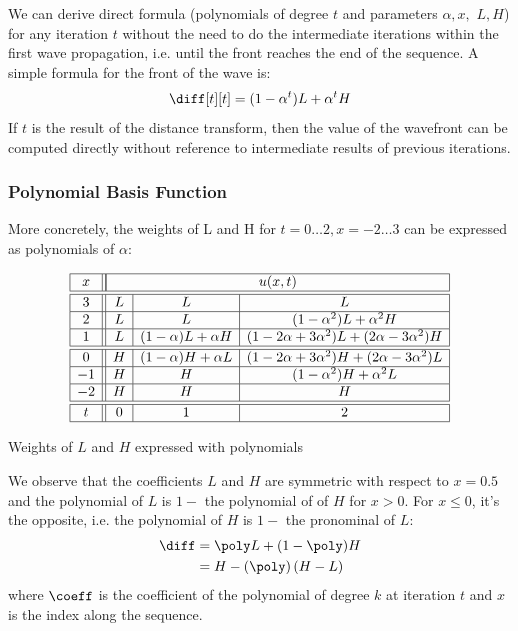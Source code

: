 We can derive direct formula (polynomials of degree $t$ and parameters $\alpha, x,$
$L, H$) for any iteration $t$ without the need to do the intermediate 
iterations within the first wave propagation, i.e. until the front reaches the end 
of the sequence. A simple formula for the front of the wave is:
%
\begin{equation}
    \diff[t][t] = (1 - \alpha^t)L + \alpha^t H
    \label{eq:wavefront}
\end{equation}
%
If $t$ is the result of the distance transform, then the value of the wavefront can be
computed directly without reference to intermediate results of previous iterations.

\subsubsection{Polynomial Basis Function}

More concretely, the weights of L and H for $t=0\ldots2,x=-2\ldots3$ can be expressed 
as polynomials of $\alpha$:

\begin{table}[h]
    \small
    \centering
    $$
        \begin{array}{|c||c|c|c|} \hline
         x & \multicolumn{3}{|c|}{u(x,t)} \\ \hline \hline
         3 & L &          L           &                     L                       \\ \hline
         2 & L &          L           &         (1-\alpha^2)L+\alpha^2H             \\ \hline
         1 & L & (1-\alpha)L+\alpha H & (1-2\alpha+3\alpha^2)L+(2\alpha-3\alpha^2)H \\ \hline \hline
         0 & H & (1-\alpha)H+\alpha L & (1-2\alpha+3\alpha^2)H+(2\alpha-3\alpha^2)L \\ \hline
        -1 & H &          H           &         (1-\alpha^2)H+\alpha^2L             \\ \hline
        -2 & H &          H           &                     H                       \\ \hline \hline
        t  & 0 &          1           &                     2                       \\ \hline
        \end{array}
    $$
    \caption{Weights of $L$ and $H$ expressed with polynomials}
    \label{tab:weight_poly}
\end{table}

We observe that the coefficients $L$ and $H$ are symmetric with respect to $x=0.5$ and 
the polynomial of $L$ is $1-$ the polynomial of of $H$ for $x>0$. For $x\le0$, it's the 
opposite, i.e. the polynomial of $H$ is $1-$ the pronominal of $L$:
%
\begin{equation}
    \begin{split}
        \diff & = \poly L + (1 - \poly) H \\
              & = H - \left(\poly \right) (H-L)
    \end{split}
    \label{eq:polynomial}
\end{equation}
%
where $\coeff$ is the coefficient of the polynomial of degree $k$ at iteration $t$ and
$x$ is the index along the sequence.

